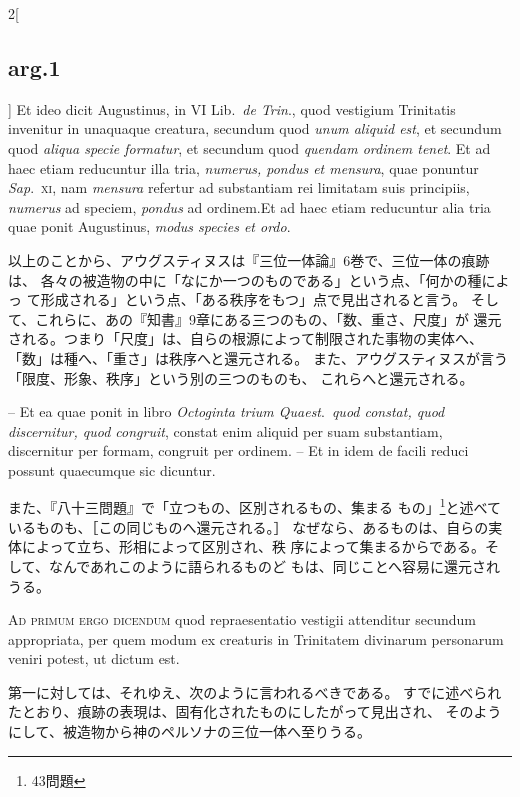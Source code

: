 \documentclass[paper=a4paper,fontsize=10pt,jafontsize=9pt,titlepage]{jlreq}
\begin{document}
\begin{paracol}{2}[\subsection{arg.1}]
Et ideo dicit Augustinus, in VI Lib.~{\itshape de Trin}., quod vestigium
 Trinitatis invenitur in unaquaque creatura, secundum quod {\itshape
 unum aliquid est}, et secundum quod {\itshape aliqua specie formatur},
 et secundum quod {\itshape quendam ordinem tenet}. Et ad haec etiam
 reducuntur illa tria, {\itshape numerus, pondus et mensura}, quae
 ponuntur {\itshape Sap}.~{\scshape xi}, nam {\itshape mensura} refertur
 ad substantiam rei limitatam suis principiis, {\itshape numerus} ad
 speciem, {\itshape pondus} ad ordinem.Et ad haec etiam
 reducuntur alia tria quae ponit Augustinus, {\itshape modus species et
 ordo}.

\switchcolumn

以上のことから、アウグスティヌスは『三位一体論』6巻で、三位一体の痕跡は、
 各々の被造物の中に「なにか一つのものである」という点、「何かの種によっ
 て形成される」という点、「ある秩序をもつ」点で見出されると言う。
そして、これらに、あの『知書』9章にある三つのもの、「数、重さ、尺度」が
 還元される。つまり「尺度」は、自らの根源によって制限された事物の実体へ、
 「数」は種へ、「重さ」は秩序へと還元される。
また、アウグスティヌスが言う「限度、形象、秩序」という別の三つのものも、
 これらへと還元される。

\switchcolumn*

-- Et ea quae ponit in libro {\itshape Octoginta trium
 Quaest}.~{\itshape quod constat, quod discernitur, quod congruit},
 constat enim aliquid per suam substantiam, discernitur per formam,
 congruit per ordinem. -- Et in idem de facili reduci possunt quaecumque
 sic dicuntur.

\switchcolumn

また、『八十三問題』で「立つもの、区別されるもの、集まる
 もの」\footnote{43問題}と述べているものも、［この同じものへ還元される。］
 なぜなら、あるものは、自らの実体によって立ち、形相によって区別され、秩
 序によって集まるからである。そして、なんであれこのように語られるものど
 もは、同じことへ容易に還元されうる。

\switchcolumn*[\subsection{ad.1}]

{\scshape Ad primum ergo dicendum} quod repraesentatio
 vestigii attenditur secundum appropriata, per quem modum ex creaturis
 in Trinitatem divinarum personarum veniri potest, ut dictum est.

\switchcolumn

第一に対しては、それゆえ、次のように言われるべきである。
すでに述べられたとおり、痕跡の表現は、固有化されたものにしたがって見出され、
 そのようにして、被造物から神のペルソナの三位一体へ至りうる。


\end{paracol}
\end{document}
